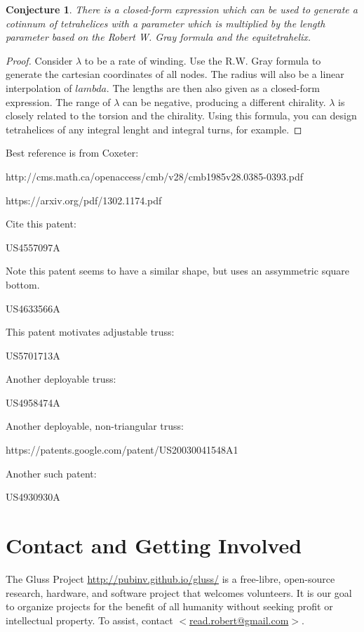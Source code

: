\documentclass[11pt]{article}
\newtheorem{conjecture}{Conjecture}
\begin{document}
  \begin{conjecture}
    There is a closed-form expression which can be used to generate a cotinnum of tetrahelices with a parameter which is
    multiplied by the length parameter based on the Robert W. Gray formula and the equitetrahelix.
  \end{conjecture}

  \begin{proof}
    Consider $\lambda$ to be a rate of winding. Use the R.W. Gray formula to generate the cartesian coordinates of all nodes.
    The radius will also be a linear interpolation of $lambda$. The lengths are then also given as a closed-form expression.
    The range of $\lambda$ can be negative, producing a different chirality. $\lambda$ is closely related to the torsion
    and the chirality. Using this formula, you can design tetrahelices of any integral lenght and integral turns, for example.
    \end{proof}

  


  Best reference is from Coxeter:
  
  http://cms.math.ca/openaccess/cmb/v28/cmb1985v28.0385-0393.pdf

https://arxiv.org/pdf/1302.1174.pdf

Cite this patent:


US4557097A

Note this patent seems to have a similar shape, but uses an assymmetric square bottom.

US4633566A

This patent motivates adjustable truss:

US5701713A

Another deployable truss:

US4958474A

Another deployable, non-triangular truss:

https://patents.google.com/patent/US20030041548A1


Another such patent:

US4930930A

\section{Contact and Getting Involved}

The Gluss Project \url{http://pubinv.github.io/gluss/}
is a free-libre, open-source research, hardware, and software project that welcomes volunteers.
It is our goal to organize projects for the benefit of all humanity without seeking profit or intellectual property.
To assist, contact \href{mailto:read.robert@gmail.com}{$<$read.robert@gmail.com$>$}.



\end{document}
